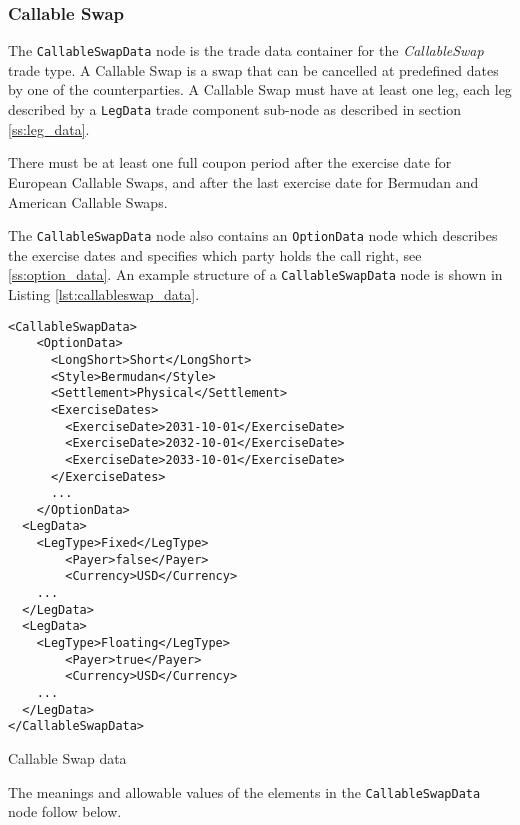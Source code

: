\subsubsection{Callable Swap}\label{ss:callable_swap}

The \lstinline!CallableSwapData! node is the trade data container for the \emph{CallableSwap} trade type. A Callable Swap is a
 swap that can be cancelled at predefined dates by one of the counterparties. A Callable Swap must have at least one leg, each leg described by a \lstinline!LegData! trade component sub-node as described in section
\ref{ss:leg_data}.  

There must be at least one full coupon period after the exercise date for European Callable Swaps, and after the last exercise date for Bermudan and American Callable Swaps. 

The \lstinline!CallableSwapData! node also contains an \lstinline!OptionData! node which describes
the exercise dates and specifies which party holds the call right, see \ref{ss:option_data}. An example structure of a
\lstinline!CallableSwapData! node is shown in Listing \ref{lst:callableswap_data}.

\begin{listing}[H]
\begin{verbatim}
<CallableSwapData>
    <OptionData>
      <LongShort>Short</LongShort>
      <Style>Bermudan</Style>
      <Settlement>Physical</Settlement>
      <ExerciseDates>
        <ExerciseDate>2031-10-01</ExerciseDate>
        <ExerciseDate>2032-10-01</ExerciseDate>
        <ExerciseDate>2033-10-01</ExerciseDate>
      </ExerciseDates>
      ...
    </OptionData>
  <LegData>
	<LegType>Fixed</LegType>
        <Payer>false</Payer>    
        <Currency>USD</Currency>	
	...
  </LegData>
  <LegData>
	<LegType>Floating</LegType>
        <Payer>true</Payer>     
        <Currency>USD</Currency>	
	...
  </LegData>
</CallableSwapData>
\end{verbatim}
\caption{Callable Swap data}
\label{lst:callableswap_data}
\end{listing}



The meanings and allowable values of the elements in the \lstinline!CallableSwapData!  node follow below.

